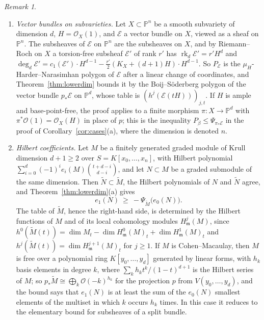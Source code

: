 \documentclass[11pt]{amsart}
\theoremstyle{definition}
\theoremstyle{remark}
\newtheorem{remark}[theorem]{Remark}
\newcommand{\PP}{\mathbb{P}}
\newcommand{\OO}{\mathcal{O}}
\newcommand{\cE}{\mathcal{E}}
\DeclareMathOperator{\rk}{rk}
\begin{document}
\begin{remark}\label{rem:lowerdim}
\begin{enumerate}[label=(\arabic*)]
\item \emph{Vector bundles on subvarieties.} Let $X\subset\PP^n$ be a smooth subvariety of dimension $d$, $H=\OO_X(1)$, and $\cE$ a vector bundle on $X$, viewed as a sheaf on $\PP^n$. The subsheaves of $\cE$ on $\PP^n$ are the subsheaves on $X$, and by Riemann--Roch on $X$ a torsion-free subsheaf $\cE'$ of rank $r'$ has $\rk_d\cE'=r'H^d$ and $\deg_d\cE'=c_1(\cE')\cdot H^{d-1}-\frac{r'}2(K_X+(d+1)H)\cdot H^{d-1}$. So $P_\cE$ is the $\mu_H$-Harder--Narasimhan polygon of $\cE$ after a linear change of coordinates, and Theorem~\ref{thm:lowerdim} bounds it by the Boij--Söderberg polygon of the vector bundle $p_*\cE$ on $\PP^d$, whose table is $(h^j(\cE(tH)))_{j,t}$. If $H$ is ample and base-point-free, the proof applies to a finite morphism $\pi\colon X\to\PP^d$ with $\pi^*\OO(1)=\OO_X(H)$ in place of $p$; this is the inequality $P_\beta\le\Psi_{\pi_*\cE}$ in the proof of Corollary~\ref{cor:cases}(a), where the dimension is denoted $n$.
\item \emph{Hilbert coefficients.} Let $M$ be a finitely generated graded module of Krull dimension $d+1\ge2$ over $S=K[x_0,\dots,x_n]$, with Hilbert polynomial $\sum_{i=0}^d(-1)^ie_i(M)\binom{t+d-i}{d-i}$, and let $N\subset M$ be a graded submodule of the same dimension. Then $\widetilde N\subset\widetilde M$, the Hilbert polynomials of $N$ and $\widetilde N$ agree, and Theorem~\ref{thm:lowerdim}(a) gives
\[
e_1(N)\ \ge\ -\Psi_{\widetilde M}\big(e_0(N)\big).
\]
The table of $\widetilde M$, hence the right-hand side, is determined by the Hilbert functions of $M$ and of its local cohomology modules $H^j_{\mathfrak m}(M)$, since $h^0(\widetilde M(t))=\dim M_t-\dim H^0_{\mathfrak m}(M)_t+\dim H^1_{\mathfrak m}(M)_t$ and $h^j(\widetilde M(t))=\dim H^{j+1}_{\mathfrak m}(M)_t$ for $j\ge1$. If $M$ is Cohen--Macaulay, then $M$ is free over a polynomial ring $K[y_0,\dots,y_d]$ generated by linear forms, with $h_k$ basis elements in degree $k$, where $\sum_kh_kt^k/(1-t)^{d+1}$ is the Hilbert series of $M$; so $p_*\widetilde M\cong\bigoplus_k\OO(-k)^{h_k}$ for the projection $p$ from $V(y_0,\dots,y_d)$, and the bound says that $e_1(N)$ is at least the sum of the $e_0(N)$ smallest elements of the multiset in which $k$ occurs $h_k$ times. In this case it reduces to the elementary bound for subsheaves of a split bundle.

\end{enumerate}
\end{remark}
\end{document}
